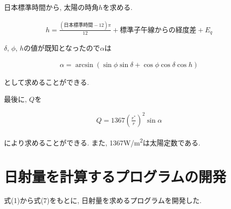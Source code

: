 日本標準時間から, 太陽の時角$h$を求める.

\begin{eqnarray}
  h = \frac{(日本標準時間-12)\pi}{12}+標準子午線からの経度差+E_q
\end{eqnarray}

$\delta$, $\phi$, $h$の値が既知となったので$\alpha$は

\begin{eqnarray}
  \alpha = \arcsin (\sin \phi\sin \delta+\cos \phi\cos \delta\cos h)
\end{eqnarray}

として求めることができる.

最後に, $Q$を

\begin{eqnarray}
  Q = 1367(\frac{r^{*}}{r})^{2}\sin \alpha
\end{eqnarray}

により求めることができる.
また, 1367\si{\watt}/\si{\metre\squared}は太陽定数である.

\section{日射量を計算するプログラムの開発}
式(1)から式(7)をもとに, 日射量を求めるプログラムを開発した.







